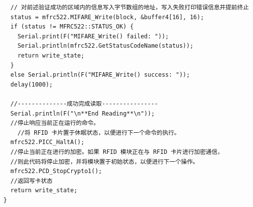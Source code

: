 \documentclass{article}
\begin{document}
\begin{lstlisting}
  // 对前述验证成功的区域内的信息写入字节数组的地址，写入失败打印错误信息并提前终止
  status = mfrc522.MIFARE_Write(block, &buffer4[16], 16);
  if (status != MFRC522::STATUS_OK) {
    Serial.print(F("MIFARE_Write() failed: "));
    Serial.println(mfrc522.GetStatusCodeName(status));
    return write_state;
  }
  else Serial.println(F("MIFARE_Write() success: "));
  delay(1000); 

  //--------------成功完成读取----------------
  Serial.println(F("\n**End Reading**\n"));
  //停止响应当前正在运行的命令。
    //将 RFID 卡片置于休眠状态，以便进行下一个命令的执行。
  mfrc522.PICC_HaltA();
  //停止当前正在进行的加密。如果 RFID 模块正在与 RFID 卡片进行加密通信，
  //则此代码将停止加密，并将模块置于初始状态，以便进行下一个操作。
  mfrc522.PCD_StopCrypto1();
  //返回写卡状态
  return write_state;
}
\end{lstlisting}
\end{document}
